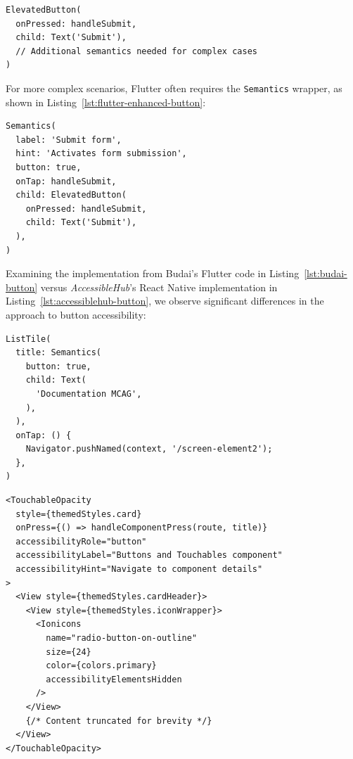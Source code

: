 \begin{lstlisting}[style=DartStyle, caption=Accessible button in Flutter, label=lst:flutter-button]
ElevatedButton(
  onPressed: handleSubmit,
  child: Text('Submit'),
  // Additional semantics needed for complex cases
)
\end{lstlisting}

For more complex scenarios, Flutter often requires the \texttt{Semantics} wrapper, as shown in Listing~\ref{lst:flutter-enhanced-button}:

\begin{lstlisting}[style=DartStyle, caption=Enhanced button accessibility in Flutter, label=lst:flutter-enhanced-button]
Semantics(
  label: 'Submit form',
  hint: 'Activates form submission',
  button: true,
  onTap: handleSubmit,
  child: ElevatedButton(
    onPressed: handleSubmit,
    child: Text('Submit'),
  ),
)
\end{lstlisting}

Examining the implementation from Budai's Flutter code in Listing~\ref{lst:budai-button} versus \textit{AccessibleHub}'s React Native implementation in Listing~\ref{lst:accessiblehub-button}, we observe significant differences in the approach to button accessibility:

\begin{lstlisting}[style=DartStyle, caption=Budai's Flutter implementation of accessible buttons, label=lst:budai-button]
ListTile(
  title: Semantics(
    button: true,
    child: Text(
      'Documentation MCAG',
    ),
  ),
  onTap: () {
    Navigator.pushNamed(context, '/screen-element2');
  },
)
\end{lstlisting}

\pagebreak

\begin{lstlisting}[style=ReactNativeStyle, caption=AccessibleHub's React Native implementation of accessible buttons, label=lst:accessiblehub-button]
<TouchableOpacity
  style={themedStyles.card}
  onPress={() => handleComponentPress(route, title)}
  accessibilityRole="button"
  accessibilityLabel="Buttons and Touchables component"
  accessibilityHint="Navigate to component details"
>
  <View style={themedStyles.cardHeader}>
    <View style={themedStyles.iconWrapper}>
      <Ionicons
        name="radio-button-on-outline"
        size={24}
        color={colors.primary}
        accessibilityElementsHidden
      />
    </View>
    {/* Content truncated for brevity */}
  </View>
</TouchableOpacity>
\end{lstlisting}

